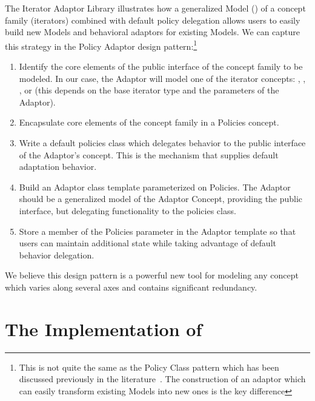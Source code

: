 \documentclass{netobjectdays}
\newcommand{\iteratoradaptor}{\code{iterator\_\-adaptor}}
\begin{document}
The Iterator Adaptor Library illustrates how a generalized Model
(\iteratoradaptor{}) of a concept family (iterators) combined with
default policy delegation allows users to easily build new Models and
behavioral adaptors for existing Models. We can capture this strategy
in the Policy Adaptor design pattern:\footnote{This is not quite the
same as the Policy Class pattern which has been discussed previously
in the literature~\cite{alexandrescu01:_modern_cpp_design}. The
construction of an adaptor which can easily transform existing Models
into new ones is the key difference}\begin{enumerate}

\item Identify the core elements of the public
  interface of the concept family to be modeled. In our case, the
  Adaptor will model one of the iterator concepts:
  , ,
  , or
   (this depends on the
  base iterator type and the parameters of the Adaptor). 
   
\item Encapsulate core elements of the concept family in a
  Policies concept.

\item Write a default policies class which delegates behavior to the
  public interface of the Adaptor's concept. This is the mechanism that
  supplies default adaptation behavior.
  
\item Build an Adaptor class template parameterized on Policies. The
  Adaptor should be a generalized model of the Adaptor Concept,
  providing the public interface, but delegating functionality to the
  policies class.
  
\item Store a member of the Policies parameter in the Adaptor template
  so that users can maintain additional state while taking advantage of
  default behavior delegation.

\end{enumerate}

We believe this design pattern is a powerful new tool for modeling any
concept which varies along several axes and contains significant
redundancy.

\section{The Implementation of \iteratoradaptor{}}
\end{document}

